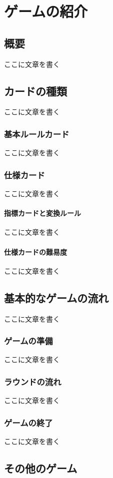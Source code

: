 \documentclass[index]{subfiles}
\begin{document}
  \chapter{ゲームの紹介}
  \label{ch:first}

  \section{概要}
  \label{sec:game_abstruct}

  ここに文章を書く

  \section{カードの種類}
  \label{sec:game_cardtype}

  ここに文章を書く

  \subsection{基本ルールカード}

  ここに文章を書く

  \subsection{仕様カード}

  ここに文章を書く

  \subsubsection{指標カードと変換ルール}

  ここに文章を書く

  \subsubsection{仕様カードの難易度}

  ここに文章を書く

  \section{基本的なゲームの流れ}
  \label{sec:game_flow}

  ここに文章を書く

  \subsection{ゲームの準備}

  ここに文章を書く

  \subsection{ラウンドの流れ}

  ここに文章を書く

  \subsection{ゲームの終了}

  ここに文章を書く

  \section{その他のゲーム}
  \label{sec:game_online_manual}
\end{document}
